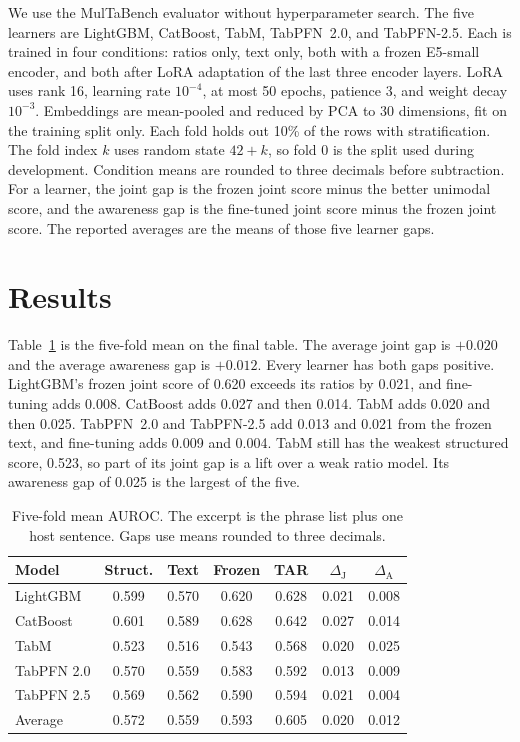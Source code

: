 \documentclass{article}
\begin{document}
We use the MulTaBench evaluator without hyperparameter search.
The five learners are LightGBM, CatBoost, TabM, TabPFN~2.0, and TabPFN-2.5.
Each is trained in four conditions: ratios only, text only, both with a frozen E5-small encoder, and both after LoRA adaptation of the last three encoder layers.
LoRA uses rank 16, learning rate $10^{-4}$, at most 50 epochs, patience 3, and weight decay $10^{-3}$.
Embeddings are mean-pooled and reduced by PCA to 30 dimensions, fit on the training split only.
Each fold holds out 10\% of the rows with stratification.
The fold index $k$ uses random state $42{+}k$, so fold 0 is the split used during development.
Condition means are rounded to three decimals before subtraction.
For a learner, the joint gap is the frozen joint score minus the better unimodal score, and the awareness gap is the fine-tuned joint score minus the frozen joint score.
The reported averages are the means of those five learner gaps.

\section{Results}

Table~\ref{tab:main} is the five-fold mean on the final table.
The average joint gap is $+0.020$ and the average awareness gap is $+0.012$.
Every learner has both gaps positive.
LightGBM's frozen joint score of 0.620 exceeds its ratios by 0.021, and fine-tuning adds 0.008.
CatBoost adds 0.027 and then 0.014.
TabM adds 0.020 and then 0.025.
TabPFN~2.0 and TabPFN-2.5 add 0.013 and 0.021 from the frozen text, and fine-tuning adds 0.009 and 0.004.
TabM still has the weakest structured score, 0.523, so part of its joint gap is a lift over a weak ratio model.
Its awareness gap of 0.025 is the largest of the five.

\begin{table}[H]
\centering
\caption{Five-fold mean AUROC. The excerpt is the phrase list plus one host sentence. Gaps use means rounded to three decimals.}
\label{tab:main}
\small
\setlength{\tabcolsep}{4pt}
\begin{tabular}{lcccccc}
\toprule
Model & Struct. & Text & Frozen & TAR & $\Delta_{\mathrm{J}}$ & $\Delta_{\mathrm{A}}$ \\
\midrule
LightGBM & 0.599 & 0.570 & 0.620 & 0.628 & 0.021 & 0.008 \\
CatBoost & 0.601 & 0.589 & 0.628 & 0.642 & 0.027 & 0.014 \\
TabM & 0.523 & 0.516 & 0.543 & 0.568 & 0.020 & 0.025 \\
TabPFN 2.0 & 0.570 & 0.559 & 0.583 & 0.592 & 0.013 & 0.009 \\
TabPFN 2.5 & 0.569 & 0.562 & 0.590 & 0.594 & 0.021 & 0.004 \\
\midrule
Average & 0.572 & 0.559 & 0.593 & 0.605 & 0.020 & 0.012 \\
\bottomrule
\end{tabular}
\end{table}
\end{document}
